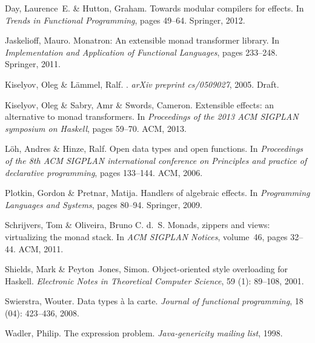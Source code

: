 \documentclass[runningheads,a4paper]{llncs}
\begin{document}
\begin{thebibliography}{4}

Day, Laurence~E. \& Hutton, Graham.
\newblock Towards modular compilers for effects.
\newblock In \emph{Trends in Functional Programming}, pages 49--64. Springer,
  2012.

Jaskelioff, Mauro.
\newblock Monatron: An extensible monad transformer library.
\newblock In \emph{Implementation and Application of Functional Languages},
  pages 233--248. Springer, 2011.
  
  Kiselyov, Oleg \& L{\"a}mmel, Ralf.
  .
  \newblock \emph{arXiv preprint cs/0509027}, 2005.
  \newblock Draft.

Kiselyov, Oleg \& Sabry, Amr \& Swords, Cameron.
\newblock Extensible effects: an alternative to monad transformers.
\newblock In \emph{Proceedings of the 2013 ACM SIGPLAN symposium on Haskell},
  pages 59--70. ACM, 2013.

L{\"o}h, Andres \& Hinze, Ralf.
\newblock Open data types and open functions.
\newblock In \emph{Proceedings of the 8th ACM SIGPLAN international conference
  on Principles and practice of declarative programming}, pages 133--144. ACM,
  2006.

Plotkin, Gordon \& Pretnar, Matija.
\newblock Handlers of algebraic effects.
\newblock In \emph{Programming Languages and Systems}, pages 80--94. Springer,
  2009.

Schrijvers, Tom \& Oliveira, Bruno C. d.~S.
\newblock Monads, zippers and views: virtualizing the monad stack.
\newblock In \emph{ACM SIGPLAN Notices}, volume~46, pages 32--44. ACM, 2011.

Shields, Mark \& Peyton~Jones, Simon.
\newblock Object-oriented style overloading for Haskell.
\newblock \emph{Electronic Notes in Theoretical Computer Science}, 59
  (1): 89--108, 2001.

Swierstra, Wouter.
\newblock Data types {\`a} la carte.
\newblock \emph{Journal of functional programming}, 18 (04):
  423--436, 2008.

Wadler, Philip.
\newblock The expression problem.
\newblock \emph{Java-genericity mailing list}, 1998.


\end{thebibliography}
\end{document}
